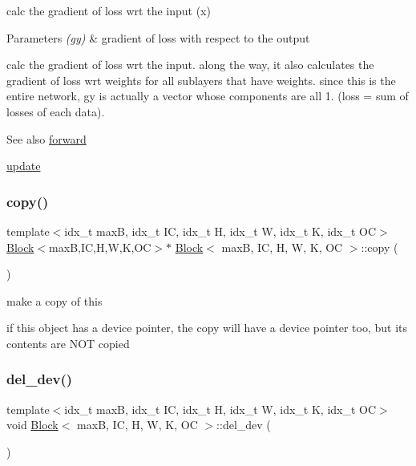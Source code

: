 calc the gradient of loss wrt the input (x) 


\begin{DoxyParams}{Parameters}
{\em (gy)} & gradient of loss with respect to the output\\
\hline
\end{DoxyParams}
calc the gradient of loss wrt the input. along the way, it also calculates the gradient of loss wrt weights for all sublayers that have weights. since this is the entire network, gy is actually a vector whose components are all 1. (loss = sum of losses of each data). \begin{DoxySeeAlso}{See also}
\hyperlink{structBlock_a6a6ee3389b0ea5618109c9ca525ba9bf}{forward} 

\hyperlink{structBlock_a3d431dfca3c47701c1c41e471ea17c8b}{update} 
\end{DoxySeeAlso}
\mbox{\label{structBlock_a10734345f8456513bbd7c792b51656af}} 
\subsubsection{\texorpdfstring{copy()}{copy()}}
{\footnotesize\ttfamily template$<$idx\+\_\+t maxB, idx\+\_\+t IC, idx\+\_\+t H, idx\+\_\+t W, idx\+\_\+t K, idx\+\_\+t OC$>$ \\
\hyperlink{structBlock}{Block}$<$maxB,IC,H,W,K,OC$>$$\ast$ \hyperlink{structBlock}{Block}$<$ maxB, IC, H, W, K, OC $>$\+::copy (\begin{DoxyParamCaption}{ }\end{DoxyParamCaption})\hspace{0.3cm}{\ttfamily [inline]}}



make a copy of this 

if this object has a device pointer, the copy will have a device pointer too, but its contents are N\+OT copied \mbox{\label{structBlock_a46e9e4f4dcffddc409fa2b20263ea3b9}} 
\subsubsection{\texorpdfstring{del\+\_\+dev()}{del\_dev()}}
{\footnotesize\ttfamily template$<$idx\+\_\+t maxB, idx\+\_\+t IC, idx\+\_\+t H, idx\+\_\+t W, idx\+\_\+t K, idx\+\_\+t OC$>$ \\
void \hyperlink{structBlock}{Block}$<$ maxB, IC, H, W, K, OC $>$\+::del\+\_\+dev (\begin{DoxyParamCaption}{ }\end{DoxyParamCaption})\hspace{0.3cm}{\ttfamily [inline]}}



